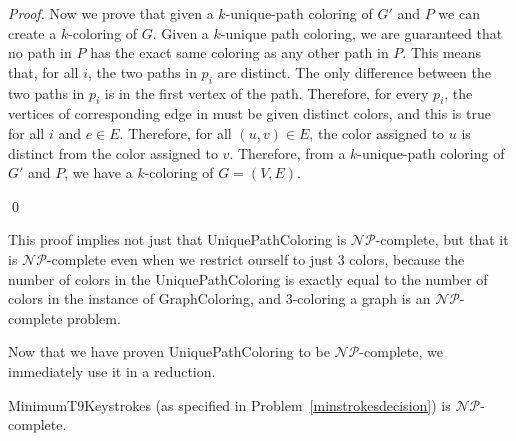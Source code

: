 \documentclass[runningheads]{llncs}
\newcommand{\NP}{\ensuremath{\mathcal{NP}}}
\begin{document}
\begin{proof}
Now we prove that given a $k$-unique-path coloring of $G'$ and $P$ we can
create a $k$-coloring of $G$.  Given a $k$-unique path coloring, we are
guaranteed that no path in $P$ has the exact same coloring as any other path in
$P$.  This means that, for all $i$, the two paths in $p_i$ are distinct.  The
only difference between the two paths in $p_i$ is in the first vertex of the
path.  Therefore, for every $p_i$, the vertices of corresponding edge in must
be given distinct colors, and this is true for all $i$ and $e \in E$.
Therefore, for all $(u,v)\in E$, the color assigned to $u$ is distinct from the
color assigned to $v$.  Therefore, from a $k$-unique-path coloring of $G'$ and
$P$, we have a $k$-coloring of $G=(V,E)$.

\qed 
\end{proof}

This proof implies not just that {\sc UniquePathColoring} is \NP-complete, but that it is \NP-complete even when we restrict ourself to just 3 colors, because the number of colors in the {\sc UniquePathColoring} is exactly equal to the number of colors in the instance of {\sc GraphColoring}, and 3-coloring a graph is an \NP-complete problem\cite{3color}.

Now that we have proven {\sc UniquePathColoring} to be \NP-complete, we
immediately use it in a reduction.  
\begin{theorem}{\sc MinimumT9Keystrokes} (as specified in
Problem~\ref{minstrokesdecision}) is \NP-complete.  \end{theorem}
\end{document}
